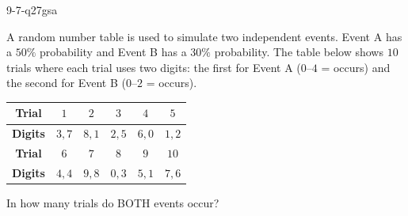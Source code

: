 \begin{practiceQuestion}{9-7-q27}{gsa}
\begin{questionText}
A random number table is used to simulate two independent events. Event A has a $50\%$ probability and Event B has a $30\%$ probability. The table below shows $10$ trials where each trial uses two digits: the first for Event A ($0$--$4$ = occurs) and the second for Event B ($0$--$2$ = occurs).

\begin{center}
\begin{tabular}{|c|c|c|c|c|c|}
\hline
\textbf{Trial} & $1$ & $2$ & $3$ & $4$ & $5$ \\
\hline
\textbf{Digits} & $3, 7$ & $8, 1$ & $2, 5$ & $6, 0$ & $1, 2$ \\
\hline
\hline
\textbf{Trial} & $6$ & $7$ & $8$ & $9$ & $10$ \\
\hline
\textbf{Digits} & $4, 4$ & $9, 8$ & $0, 3$ & $5, 1$ & $7, 6$ \\
\hline
\end{tabular}
\end{center}

In how many trials do BOTH events occur?
\end{questionText}
\end{practiceQuestion}
